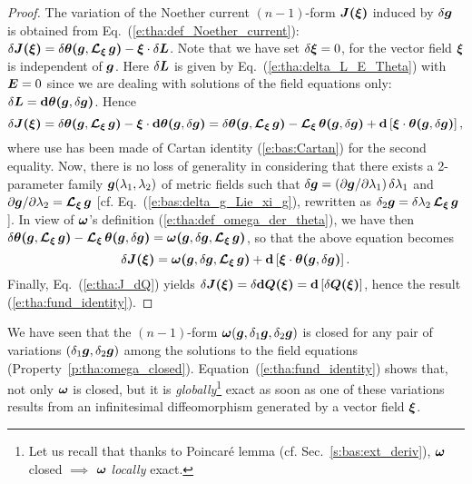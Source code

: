 \begin{proof}
The variation of the Noether current $(n-1)$-form $\bm{J}\textbf{(}\bm{\xi}\textbf{)}$ induced by
$\delta\bm{g}$ is obtained from Eq.~(\ref{e:tha:def_Noether_current}):
$\delta \bm{J}\textbf{(}\bm{\xi}\textbf{)} = \delta \bm{\theta}\textbf{(}\bm{g},\bm{\mathcal{L}}_{\bm{\xi}}\,\bm{g}\textbf{)}
    - \bm{\xi}\cdot\delta\bm{L}$.
Note that we have set $\delta\bm{\xi} = 0$, for the vector field $\bm{\xi}$ is
independent of $\bm{g}$.
Here $\delta\bm{L}$ is given by Eq.~(\ref{e:tha:delta_L_E_Theta}) with $\bm{E} = 0$
since we are dealing with solutions of the field equations only:
$\delta\bm{L} = \mathbf{d} \bm{\theta}\textbf{(}\bm{g},\delta\bm{g}\textbf{)}$.
Hence
\[
    \delta \bm{J}\textbf{(}\bm{\xi}\textbf{)} = \delta \bm{\theta}\textbf{(}\bm{g},\bm{\mathcal{L}}_{\bm{\xi}}\,\bm{g}\textbf{)}
    - \bm{\xi}\cdot \mathbf{d} \bm{\theta}\textbf{(}\bm{g},\delta\bm{g}\textbf{)}
    = \delta \bm{\theta}\textbf{(}\bm{g},\bm{\mathcal{L}}_{\bm{\xi}}\,\bm{g}\textbf{)} - \bm{\mathcal{L}}_{\bm{\xi}}\, \bm{\theta}\textbf{(}\bm{g},\delta\bm{g}\textbf{)} + \mathbf{d}\left[ \bm{\xi}\cdot \bm{\theta}\textbf{(}\bm{g},\delta\bm{g}\textbf{)} \right] ,
\]
where use has been made of Cartan identity (\ref{e:bas:Cartan}) for the second equality.
Now, there is no loss of generality in considering that there exists
a 2-parameter family $\bm{g}(\lambda_1,\lambda_2)$ of metric fields such that
$\delta\bm{g} = ({\partial \bm{g}}/{\partial \lambda_1}) \, \delta\lambda_1$ and
${\partial \bm{g}}/{\partial \lambda_2} = \bm{\mathcal{L}}_{\bm{\xi}}\,\bm{g}$ [cf. Eq.~(\ref{e:bas:delta_g_Lie_xi_g}),
rewritten as $\delta_2 \bm{g} =  \delta\lambda_2 \, \bm{\mathcal{L}}_{\bm{\xi}}\,\bm{g}$].
In view of $\bm{\omega}$'s definition (\ref{e:tha:def_omega_der_theta}),
we have then $\delta \bm{\theta}\textbf{(}\bm{g},\bm{\mathcal{L}}_{\bm{\xi}}\,\bm{g}\textbf{)} - \bm{\mathcal{L}}_{\bm{\xi}}\, \bm{\theta}\textbf{(}\bm{g},\delta\bm{g}\textbf{)} = \bm{\omega}\textbf{(}\bm{g},\delta\bm{g}, \bm{\mathcal{L}}_{\bm{\xi}}\,\bm{g}\textbf{)}$, so that
the above equation becomes
\[
    \delta \bm{J}\textbf{(}\bm{\xi}\textbf{)} = \bm{\omega}\textbf{(}\bm{g},\delta\bm{g}, \bm{\mathcal{L}}_{\bm{\xi}}\,\bm{g}\textbf{)}
        + \mathbf{d}\left[ \bm{\xi}\cdot \bm{\theta}\textbf{(}\bm{g},\delta\bm{g}\textbf{)} \right] .
\]
Finally, Eq.~(\ref{e:tha:J_dQ}) yields $\delta\bm{J}\textbf{(}\bm{\xi}\textbf{)}
= \delta \mathbf{d} \bm{Q}\textbf{(}\bm{\xi}\textbf{)}  = \mathbf{d} \left[  \delta \bm{Q}\textbf{(}\bm{\xi}\textbf{)} \right]$,
hence the result (\ref{e:tha:fund_identity}).
\end{proof}

\begin{remark}
We have seen that the $(n-1)$-form
$\bm{\omega}(\bm{g},\delta_1\bm{g},\delta_2\bm{g})$ is closed for any pair
of variations $(\delta_1\bm{g},\delta_2\bm{g})$ among the solutions to the field equations
(Property~\ref{p:tha:omega_closed}).
Equation~(\ref{e:tha:fund_identity}) shows that, not only $\bm{\omega}$ is closed, but it is
\emph{globally}\footnote{Let us recall that thanks to Poincaré lemma (cf. Sec.~\ref{s:bas:ext_deriv}),
$\bm{\omega}$ closed $\implies$ $\bm{\omega}$ \emph{locally} exact.} exact as soon as one of these variations results from an infinitesimal diffeomorphism
generated by a vector field $\bm{\xi}$.
\end{remark}

